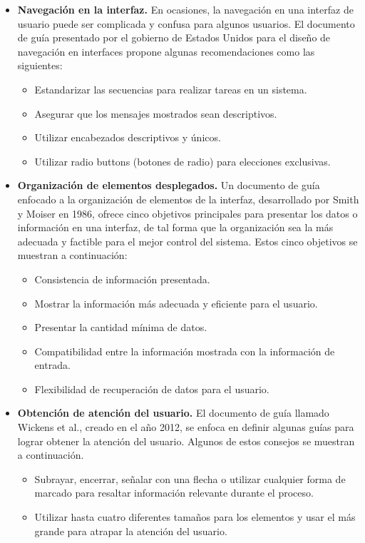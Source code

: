 \begin{itemize}
  \item \textbf{Navegación en la interfaz.} En ocasiones, la navegación en una interfaz de usuario puede ser complicada y confusa para algunos usuarios. El documento de guía presentado por el gobierno de Estados Unidos para el diseño de navegación en interfaces propone algunas recomendaciones como las siguientes:
  \begin{itemize}
    \item Estandarizar las secuencias para realizar tareas en un sistema.
    \item Asegurar que los mensajes mostrados sean descriptivos. 
    \item Utilizar encabezados descriptivos y únicos.
    \item Utilizar radio buttons (botones de radio) para elecciones exclusivas.
  \end{itemize} 
  \item \textbf{Organización de elementos desplegados.} Un documento de guía enfocado a la organización de elementos de la interfaz, desarrollado por Smith y Moiser en 1986, ofrece cinco objetivos principales para presentar los datos o información en una interfaz, de tal forma que la organización sea la más adecuada y factible para el mejor control del sistema. Estos cinco objetivos se muestran a continuación:
  \begin{itemize}
    \item Consistencia de información presentada.
    \item Mostrar la información más adecuada y eficiente para el usuario.
    \item Presentar la cantidad mínima de datos.
    \item Compatibilidad entre la información mostrada con la información de entrada.
    \item Flexibilidad de recuperación de datos para el usuario.
  \end{itemize}
  \item \textbf{Obtención de atención del usuario.} El documento de guía llamado Wickens et al., creado en el año 2012, se enfoca en definir algunas guías para lograr obtener la atención del usuario. Algunos de estos consejos se muestran a continuación.
  \begin{itemize}
    \item Subrayar, encerrar, señalar con una flecha o utilizar cualquier forma de marcado para resaltar información relevante durante el proceso.
    \item Utilizar hasta cuatro diferentes tamaños para los elementos y usar el más grande para atrapar la atención del usuario.

\end{itemize}
\end{itemize}

